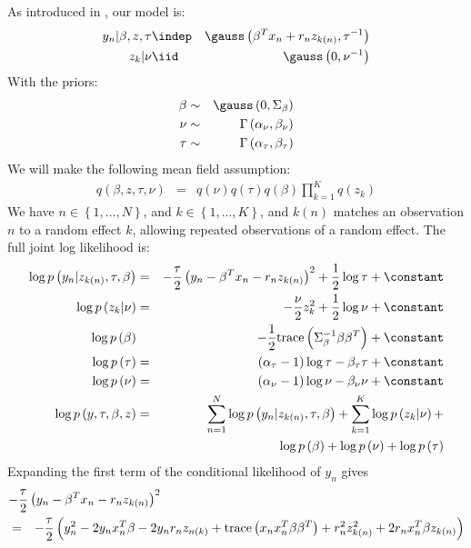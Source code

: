 As introduced in , our model is:
%
\begin{eqnarray*}
y_{n}\vert\beta,z,\tau & \indep & \gauss\left(\beta^{T}x_{n}+r_{n}z_{k\left(n\right)},\tau^{-1}\right)\\
z_{k}\vert\nu & \iid & \gauss\left(0,\nu^{-1}\right)
\end{eqnarray*}
%
With the priors:
%
\begin{eqnarray*}
\beta & \sim & \gauss\left(0,\Sigma_{\beta}\right)\\
\nu & \sim & \Gamma\left(\alpha_{\nu},\beta_{\nu}\right)\\
\tau & \sim & \Gamma\left(\alpha_{\tau},\beta_{\tau}\right)
\end{eqnarray*}
%
We will make the following mean field assumption:
%
\begin{eqnarray*}
q\left(\beta,z,\tau,\nu\right) & = & q\left(\nu\right)q\left(\tau\right)q\left(\beta\right)\prod_{k=1}^{K}q\left(z_{k}\right)
\end{eqnarray*}
%
We have $n\in\left\{ 1,...,N\right\} $, and $k\in\left\{ 1,...,K\right\} $,
and $k\left(n\right)$ matches an observation $n$ to a random effect
$k$, allowing repeated observations of a random effect. The full
joint log likelihood is:
%
\begin{eqnarray*}
\log p\left(y_{n}\vert z_{k\left(n\right)},\tau,\beta\right) & = & -\frac{\tau}{2}\left(y_{n}-\beta^{T}x_{n}-r_{n}z_{k\left(n\right)}\right)^{2}+\frac{1}{2}\log\tau+\constant\\
\log p\left(z_{k}\vert\nu\right) & = & -\frac{\nu}{2}z_{k}^{2}+\frac{1}{2}\log\nu+\constant\\
\log p\left(\beta\right) &  & -\frac{1}{2}\textrm{trace}\left(\Sigma_{\beta}^{-1}\beta\beta^{T}\right)+\constant\\
\log p\left(\tau\right) & = & \left(\alpha_{\tau}-1\right)\log\tau-\beta_{\tau}\tau+\constant\\
\log p\left(\nu\right) & = & \left(\alpha_{\nu}-1\right)\log\nu-\beta_{\nu}\nu+\constant\\
\log p\left(y,\tau,\beta,z\right) & = & \sum_{n=1}^{N}\log p\left(y_{n}\vert z_{k\left(n\right)},\tau,\beta\right)+\sum_{k=1}^{K}\log p\left(z_{k}\vert\nu\right)+\\
 &  & \log p\left(\beta\right)+\log p\left(\nu\right)+\log p\left(\tau\right)
\end{eqnarray*}
%
Expanding the first term of the conditional likelihood of $y_{n}$
gives
%
\begin{eqnarray*}
\lefteqn{-\frac{\tau}{2}\left(y_{n}-\beta^{T}x_{n}-r_{n}z_{k\left(n\right)}\right)^{2}}\\
& = & -\frac{\tau}{2}\left(y_{n}^{2}-2y_{n}x_{n}^{T}\beta-2y_{n}r_{n}z_{n\left(k\right)}+\textrm{trace}\left(x_{n}x_{n}^{T}\beta\beta^{T}\right)+r_{n}^{2}z_{k\left(n\right)}^{2}+2r_{n}x_{n}^{T}\beta z_{k\left(n\right)}\right)
\end{eqnarray*}
